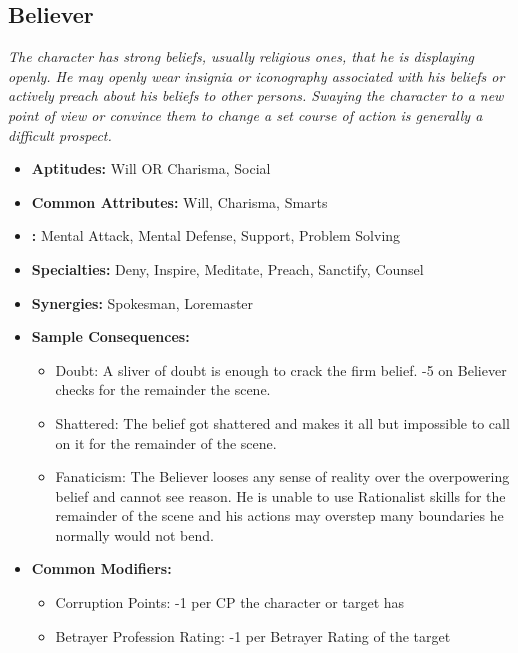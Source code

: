 \subsection{Believer}\label{Believer}
\textit{The character has strong beliefs, usually religious ones, that he is displaying openly.
He may openly wear insignia or iconography associated with his beliefs or actively preach about his beliefs to other persons.
Swaying the character to a new point of view or convince them to change a set course of action is generally a difficult prospect.}
\begin{itemize}
	\item \textbf{Aptitudes:} Will OR Charisma, Social
	\item \textbf{Common Attributes:} Will, Charisma, Smarts
	\item \textbf{:} Mental Attack, Mental Defense, Support, Problem Solving
	\item \textbf{Specialties:} Deny, Inspire, Meditate, Preach, Sanctify, Counsel
	\item \textbf{Synergies:} Spokesman, Loremaster
	\item \textbf{Sample Consequences:} 
	\begin{itemize}
		\item Doubt: A sliver of doubt is enough to crack the firm belief. -5 on Believer checks for the remainder the scene.
		\item Shattered: The belief got shattered and makes it all but impossible to call on it for the remainder of the scene.
		\item Fanaticism: The Believer looses any sense of reality over the overpowering belief and cannot see reason. He is unable to use Rationalist skills for the remainder of the scene and his actions may overstep many boundaries he normally would not bend.
	\end{itemize}
	\item \textbf{Common Modifiers:}
	\begin{itemize}
		\item Corruption Points: -1 per CP the character or target has
		\item Betrayer Profession Rating: -1 per Betrayer Rating of the target
	\end{itemize}
\end{itemize}

